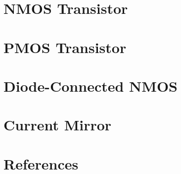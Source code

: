 \documentclass{article}
\begin{document}
\begin{titlepage}

\end{titlepage}
\section{NMOS Transistor}

\section{PMOS Transistor}

\section{Diode-Connected NMOS}

\section{Current Mirror}

\section{References}


\end{document}
